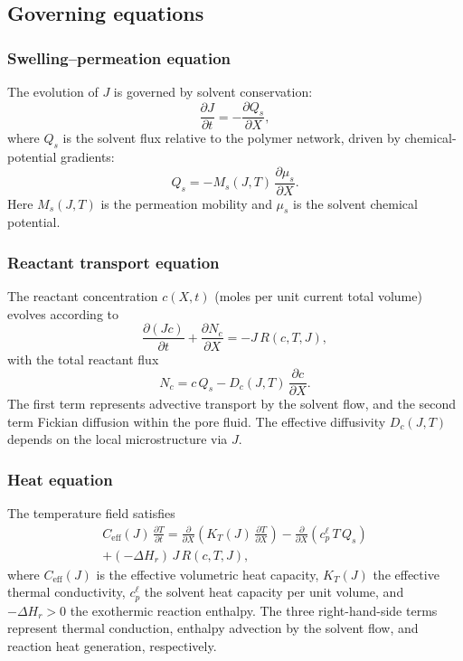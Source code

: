 \documentclass[11pt]{article}
\begin{document}
\subsection{Governing equations}

\subsubsection{Swelling--permeation equation}

The evolution of $J$ is governed by solvent conservation:
\begin{equation}
  \frac{\partial J}{\partial t} = -\frac{\partial Q_s}{\partial X},
  \label{eq:J_evol}
\end{equation}
where $Q_s$ is the solvent flux relative to the polymer network, driven by chemical-potential gradients:
\begin{equation}
  Q_s = -M_s(J,T)\,\frac{\partial \mu_s}{\partial X}.
  \label{eq:Qs}
\end{equation}
Here $M_s(J,T)$ is the permeation mobility and $\mu_s$ is the solvent chemical potential.

\subsubsection{Reactant transport equation}

The reactant concentration $c(X,t)$ (moles per unit current total volume) evolves according to
\begin{equation}
  \frac{\partial (Jc)}{\partial t}
  + \frac{\partial N_c}{\partial X}
  = -J\,R(c,T,J),
  \label{eq:c_evol}
\end{equation}
with the total reactant flux
\begin{equation}
  N_c = c\,Q_s - D_c(J,T)\,\frac{\partial c}{\partial X}.
  \label{eq:Nc}
\end{equation}
The first term represents advective transport by the solvent flow, and the second term Fickian diffusion within the pore fluid. The effective diffusivity $D_c(J,T)$ depends on the local microstructure via $J$.

\subsubsection{Heat equation}

The temperature field satisfies
\begin{multline}
  C_\mathrm{eff}(J)\,\frac{\partial T}{\partial t}
  = \frac{\partial}{\partial X}\!\left(K_T(J)\,\frac{\partial T}{\partial X}\right)
  - \frac{\partial}{\partial X}\!\left(c_p^\ell\,T\,Q_s\right)
  \\
  + (-\Delta H_r)\,J\,R(c,T,J),
  \label{eq:T_evol}
\end{multline}
where $C_\mathrm{eff}(J)$ is the effective volumetric heat capacity,
$K_T(J)$ the effective thermal conductivity, $c_p^\ell$ the solvent
heat capacity per unit volume, and $-\Delta H_r > 0$ the exothermic
reaction enthalpy.  The three right-hand-side terms represent thermal
conduction, enthalpy advection by the solvent flow, and reaction heat
generation, respectively.
\end{document}
